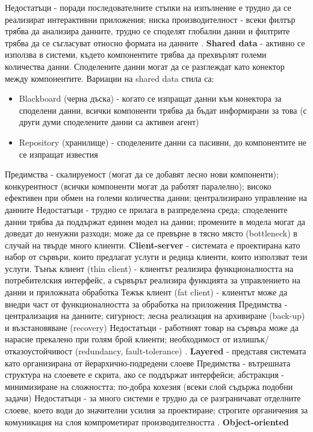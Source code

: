 \documentclass{article}
\begin{document}
Недостатъци - поради последователните стъпки на изпълнение е трудно да се реализират интерактивни приложения; ниска производителност -
всеки филтър трябва да анализира данните, трудно се споделят глобални данни и филтрите трябва да се съгласуват относно формата на
данните \newline{}. \textbf{Shared data} - активно се използва в системи, където компонентите трябва да прехвърлят големи количества данни. Споделените
данни могат да се разглеждат като конектор между компонентите. Вариации на shared data стила са:
\begin{itemize}
    \item Blackboard (черна дъска) - когато се изпращат данни към конектора за споделени данни, всички компоненти трябва да бъдат
    информирани за това (с други думи споделените данни са активен агент)
    \item Repository (хранилище) - споделените данни са пасивни, до компонентите не се изпращат известия
\end{itemize}
Предимства - скалируемост (могат да се добавят лесно нови компоненти); конкурентност (всички компоненти могат да работят паралелно);
високо ефективен при обмен на големи количества данни; централизирано управление на данните\newline
Недостатъци - трудно се прилага в разпределена среда; споделените данни трябва да поддържат единен модел на данни; промените в
модела могат да доведат до ненужни разходи; може да се превърне в тясно място (bottleneck) в случай на твърде много клиенти. \textbf{Client-server} - системата е проектирана като набор от сървъри, които предлагат услуги и редица клиенти, които
използват тези услуги.
Тънък клиент (thin client) - клиентът реализира функционалността на потребителския интерфейс, а сървърът реализира функцията за
управлението на данни и приложната обработка
Тежък клиент (fat client) - клиентът може да внедри част от функционалността за обработка на приложения \newline
Предимства - централизация на данните; сигурност; лесна реализация на архивиране (back-up) и възстановяване (recovery) \newline
Недостатъци - работният товар на сървъра може да нарасне прекалено при голям брой клиенти; необходимост от излишък/отказоустойчивост
(redundancy, fault-tolerance) . \textbf{Layered} - представя системата като организирана от йерархично-подредени слоеве \newline
Предимства - вътрешната структура на слоевете е скрита, ако се поддържат интерфейси; абстракция - минимизиране на сложността;
по-добра кохезия (всеки слой съдържа подобни задачи) \newline
Недостатъци - за много системи е трудно да се разграничават отделните слоеве, което води до значителни усилия за проектиране;
строгите органичения за комуникация на слоя компрометират производителността \newline{}. \textbf{Object-oriented}
\end{document}
